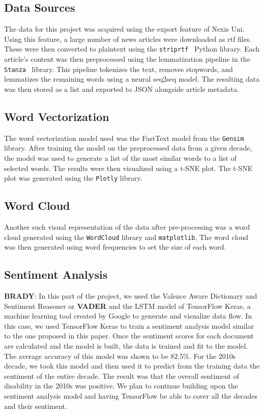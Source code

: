 \documentclass[11pt,a4paper, twocolumn]{article}
\begin{document}
\subsection{Data Sources}

The data for this project was acquired using the export feature of Nexis Uni. Using this feature, a large number of news articles were downloaded as rtf files. These were then converted to plaintext using the \texttt{striprtf}~\citep{striprtf} Python library. Each article's content was then preprocessed using the lemmatization pipeline in the \texttt{Stanza}~\citep{stanza} library. This pipeline tokenizes the text, removes stopwords, and lemmatizes the remaining words using a neural seq2seq model. The resulting data was then stored as a list and exported to JSON alongside article metadata.

\subsection{Word Vectorization}

The word vectorization model used was the FastText model from the \texttt{Gensim} library. After training the model on the preprocessed data from a given decade, the model was used to generate a list of the most similar words to a list of selected words. The results were then visualized using a t-SNE plot. The t-SNE plot was generated using the \texttt{Plotly} library.

\subsection{Word Cloud}

Another such visual representation of the data after pre-processing was a word cloud generated using the \texttt{WordCloud} library and \texttt{matplotlib}. The word cloud was then generated using word frequencies to set the size of each word.

\subsection{Sentiment Analysis}
\textbf{BRADY}: In this part of the project, we used the Valence Aware Dictionary and Sentiment Reasoner or \textbf{VADER} and the LSTM model of TensorFlow Keras, a machine learning tool created by Google to generate and visualize data flow. In this case, we used TensorFlow Keras to train a sentiment analysis model similar to the one proposed in this paper. Once the sentiment scores for each document are calculated and the model is built, the data is trained and fit to the model. The average accuracy of this model was shown to be $82.5$\%. For the 2010s decade, we took this model and then used it to predict from the training data the sentiment of the entire decade. The result was that the overall sentiment of disability in the 2010s was positive. We plan to continue building upon the sentiment analysis model and having TensorFlow be able to cover all the decades and their sentiment.
\end{document}
